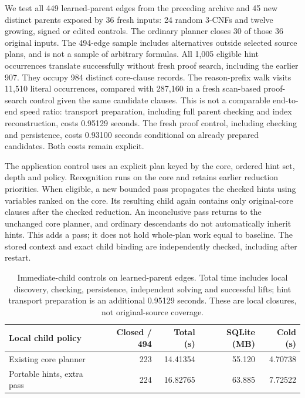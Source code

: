 \documentclass[11pt,a4paper]{article}
\numberwithin{equation}{section}
\theoremstyle{plain}
\theoremstyle{definition}
\theoremstyle{remark}
\begin{document}
We test all 449 learned-parent edges from the preceding archive and 45 new distinct parents exposed by 36 fresh inputs: 24 random 3-CNFs and twelve growing, signed or edited controls. The ordinary planner closes 30 of those 36 original inputs. The 494-edge sample includes alternatives outside selected source plans, and is not a sample of arbitrary formulas. All 1,005 eligible hint occurrences translate successfully without fresh proof search, including the earlier 907. They occupy 984 distinct core-clause records. The reason-prefix walk visits 11,510 literal occurrences, compared with 287,160 in a fresh scan-based proof-search control given the same candidate clauses. This is not a comparable end-to-end speed ratio: transport preparation, including full parent checking and index reconstruction, costs 0.95129 seconds. The fresh proof control, including checking and persistence, costs 0.93100 seconds conditional on already prepared candidates. Both costs remain explicit.

The application control uses an explicit plan keyed by the core, ordered hint set, depth and policy. Recognition runs on the core and retains earlier reduction priorities. When eligible, a new bounded pass propagates the checked hints using variables ranked on the core. Its resulting child again contains only original-core clauses after the checked reduction. An inconclusive pass returns to the unchanged core planner, and ordinary descendants do not automatically inherit hints. This adds a pass; it does not hold whole-plan work equal to baseline. The stored context and exact child binding are independently checked, including after restart.

\begin{table}[htbp]
\centering
\small
\begin{tabular}{lrrrr}
\hline
Local child policy & Closed / 494 & Total (s) & SQLite (MB) & Cold (s) \\
\hline
Existing core planner & 223 & 14.41354 & 55.120 & 4.70738 \\
Portable hints, extra pass & 224 & 16.82765 & 63.885 & 7.72522 \\
\hline
\end{tabular}
\caption{Immediate-child controls on learned-parent edges. Total time includes local discovery, checking, persistence, independent solving and successful lifts; hint transport preparation is an additional 0.95129 seconds. These are local closures, not original-source coverage.}
\label{tab:hint-transport}
\end{table}
\end{document}
